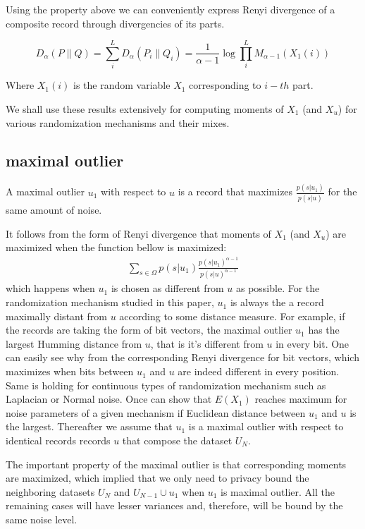 \documentclass[11pt]{article}
\begin{document}
Using the property above we can conveniently express Renyi divergence of a composite record through divergencies of its parts.

\begin{equation}  \label{eq:divergBits} 
 D_{\alpha} (P \parallel Q ) =  \sum_i^L  D_{\alpha} (P_i \parallel Q_i) =  \frac{1}{\alpha - 1} \log \prod_{i}^L  M_{\alpha-1}(X_1(i))
\end{equation}

Where $X_1(i)$ is the random variable $X_1$ corresponding to $i-th$ part.

We shall use these results extensively for computing moments of $X_1$ (and $X_u$) for various randomization mechanisms and their mixes.

\subsection{maximal outlier}
 \begin{defn}
A maximal outlier $u_1$ with respect to $u$ is a record that maximizes  $\frac{ p(s | u_1) } { p(s| u) }$ for the same amount of noise.  
\end{defn}

It follows from the form of Renyi divergence that moments of $X_1$ (and $X_u$) are maximized when the function bellow is maximized:
\begin{align}
\sum_{s \in \Omega} p(s|u_1) \frac{p(s|u_1)^{\alpha-1}}{ p(s|u)^{\alpha-1} }
\end{align}
which happens when $u_1$ is chosen as different from $u$ as possible.  For the randomization mechanism studied in this paper, $u_1$ is always the a record maximally distant from $u$ according to some distance measure.  For example, if the records are taking the form of bit vectors, the maximal outlier $u_1$ has the largest Humming distance from $u$, that is it's different from $u$ in every bit.  One can easily see why from the corresponding Renyi divergence for bit vectors, which maximizes when bits between $u_1$ and $u$ are indeed different in every position. Same is holding for continuous types of randomization mechanism such as Laplacian or Normal noise.  Once can show that $E(X_1)$ reaches maximum for noise parameters of a given mechanism if Euclidean distance between $u_1$ and $u$ is the largest.  Thereafter we assume that $u_1$ is a maximal outlier with respect to identical records records $u$ that compose the dataset $U_N$.  

The important property of the maximal outlier is that corresponding moments are maximized, which implied that we only need to privacy bound the neighboring datasets $U_N$ and $U_{N-1} \cup u_1$ when $u_1$ is maximal outlier.  All the remaining cases will have lesser variances and, therefore, will be bound by the same noise level.
\end{document}
